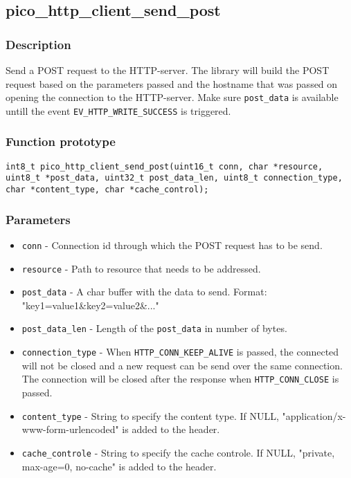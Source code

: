 
\subsection{pico\_http\_client\_send\_post}

\subsubsection*{Description}
Send a POST request to the HTTP-server. The library will build the POST request based on the parameters passed and the hostname that was passed on opening the connection to the HTTP-server. Make sure \texttt{post\_data} is available untill the event \texttt{EV\_HTTP\_WRITE\_SUCCESS} is triggered.

\subsubsection*{Function prototype}
\texttt{int8\_t pico\_http\_client\_send\_post(uint16\_t conn, char *resource, uint8\_t *post\_data, uint32\_t post\_data\_len, uint8\_t connection\_type, char *content\_type, char *cache\_control);}

\subsubsection*{Parameters}
\begin{itemize}[noitemsep]
\item \texttt{conn} - Connection id through which the POST request has to be send. 
\item \texttt{resource} - Path to resource that needs to be addressed.
\item \texttt{post\_data} - A char buffer with the data to send. Format: "key1=value1\&key2=value2\&..." 
\item \texttt{post\_data\_len} - Length of the \texttt{post\_data} in number of bytes.
\item \texttt{connection\_type} - When \texttt{HTTP\_CONN\_KEEP\_ALIVE} is passed, the connected will not be closed and a new request can be send over the same connection. The connection will be closed after the response when \texttt{HTTP\_CONN\_CLOSE} is passed.
\item \texttt{content\_type} - String to specify the content type. If NULL, "application/x-www-form-urlencoded" is added to the header.
\item \texttt{cache\_controle} - String to specify the cache controle. If NULL, "private, max-age=0, no-cache" is added to the header.
\end{itemize}
